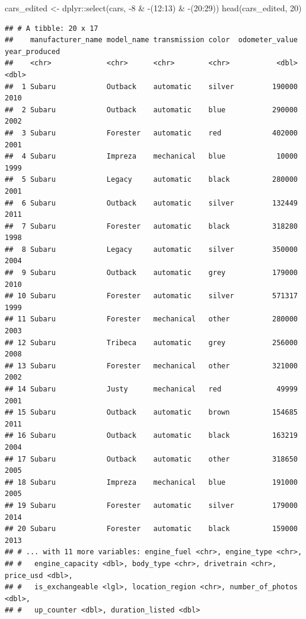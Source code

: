 \documentclass[
]{article}
\newenvironment{Shaded}{\begin{snugshade}}{\end{snugshade}}
\newcommand{\DecValTok}[1]{\textcolor[rgb]{0.00,0.00,0.81}{#1}}
\newcommand{\FunctionTok}[1]{\textcolor[rgb]{0.00,0.00,0.00}{#1}}
\newcommand{\NormalTok}[1]{#1}
\newcommand{\OtherTok}[1]{\textcolor[rgb]{0.56,0.35,0.01}{#1}}
\newcommand{\SpecialCharTok}[1]{\textcolor[rgb]{0.00,0.00,0.00}{#1}}
\begin{document}
\begin{Shaded}
\begin{Highlighting}[]
\NormalTok{cars\_edited }\OtherTok{\textless{}{-}}\NormalTok{ dplyr}\SpecialCharTok{::}\FunctionTok{select}\NormalTok{(cars, }\SpecialCharTok{{-}}\DecValTok{8} \SpecialCharTok{\&} \SpecialCharTok{{-}}\NormalTok{(}\DecValTok{12}\SpecialCharTok{:}\DecValTok{13}\NormalTok{) }\SpecialCharTok{\&} \SpecialCharTok{{-}}\NormalTok{(}\DecValTok{20}\SpecialCharTok{:}\DecValTok{29}\NormalTok{))}
\FunctionTok{head}\NormalTok{(cars\_edited, }\DecValTok{20}\NormalTok{)}
\end{Highlighting}
\end{Shaded}

\begin{verbatim}
## # A tibble: 20 x 17
##    manufacturer_name model_name transmission color  odometer_value year_produced
##    <chr>             <chr>      <chr>        <chr>           <dbl>         <dbl>
##  1 Subaru            Outback    automatic    silver         190000          2010
##  2 Subaru            Outback    automatic    blue           290000          2002
##  3 Subaru            Forester   automatic    red            402000          2001
##  4 Subaru            Impreza    mechanical   blue            10000          1999
##  5 Subaru            Legacy     automatic    black          280000          2001
##  6 Subaru            Outback    automatic    silver         132449          2011
##  7 Subaru            Forester   automatic    black          318280          1998
##  8 Subaru            Legacy     automatic    silver         350000          2004
##  9 Subaru            Outback    automatic    grey           179000          2010
## 10 Subaru            Forester   automatic    silver         571317          1999
## 11 Subaru            Forester   mechanical   other          280000          2003
## 12 Subaru            Tribeca    automatic    grey           256000          2008
## 13 Subaru            Forester   mechanical   other          321000          2002
## 14 Subaru            Justy      mechanical   red             49999          2001
## 15 Subaru            Outback    automatic    brown          154685          2011
## 16 Subaru            Outback    automatic    black          163219          2004
## 17 Subaru            Outback    automatic    other          318650          2005
## 18 Subaru            Impreza    mechanical   blue           191000          2005
## 19 Subaru            Forester   automatic    silver         179000          2014
## 20 Subaru            Forester   automatic    black          159000          2013
## # ... with 11 more variables: engine_fuel <chr>, engine_type <chr>,
## #   engine_capacity <dbl>, body_type <chr>, drivetrain <chr>, price_usd <dbl>,
## #   is_exchangeable <lgl>, location_region <chr>, number_of_photos <dbl>,
## #   up_counter <dbl>, duration_listed <dbl>
\end{verbatim}
\end{document}

